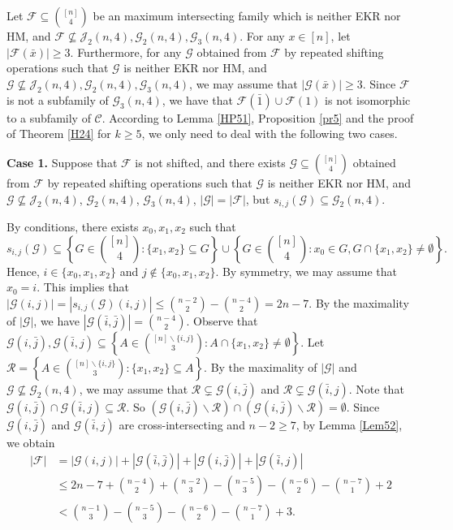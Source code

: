 \documentclass[11pt]{article}
\numberwithin{equation}{section}
\begin{document}
Let $\mathcal{F} \subseteq\binom{[n]}{4}$ be an maximum intersecting family which is neither EKR nor HM, and $\mathcal{F} \nsubseteq \mathcal{J}_2(n, 4),\mathcal{G}_2(n, 4), \mathcal{G}_3(n, 4)$. For any $x \in[n]$, let $|\mathcal{F}(\bar{x})|\geq 3$. Furthermore, 
for any $\mathcal{G}$ obtained from $\mathcal{F}$ by repeated shifting operations such that $\mathcal{G}$  is neither EKR nor HM, and  $\mathcal{G} \nsubseteq \mathcal{J}_2(n, 4), \mathcal{G}_2(n, 4), \mathcal{G}_3(n, 4)$, we may assume that $|\mathcal{G}(\bar{x})|\geq 3$.
Since $\mathcal{F}$ is not a subfamily of $\mathcal{G}_3(n, 4)$, we have that $\mathcal{F}(\bar{1})\cup \mathcal{F}(1)$ is  not isomorphic to a subfamily of $\mathcal{C}$.  According to Lemma \ref{HP51}, Proposition \ref{pr5} and the proof of Theorem \ref{H24} for $k\geq 5$, we only need to deal with the following two cases.

{\bf Case 1.}
 Suppose that $\mathcal{F}$ is not shifted, and there exists $\mathcal{G} \subseteq\binom{[n]}{4}$ obtained from $\mathcal{F}$ by repeated shifting operations such that $\mathcal{G}$  is neither EKR nor HM, and  $\mathcal{G} \nsubseteq \mathcal{J}_2(n, 4)$, $\mathcal{G}_2(n, 4)$, $\mathcal{G}_3(n, 4)$, $|\mathcal{G}|=|\mathcal{F}|$, but
$s_{i, j}(\mathcal{G})\subseteq \mathcal{G}_2(n, 4)$.

By conditions, there exists  $x_0, x_1, x_2$ such that
$$
s_{i, j}(\mathcal{G})\subseteq \left\{G \in\binom{[n]}{4}: \{x_1,x_2\} \subseteq G\right\} \cup\left\{G \in\binom{[n]}{4}: x_0 \in G, G \cap \{x_1,x_2\} \neq \emptyset\right\}.
$$
Hence, $i\in \{x_0, x_1, x_2\}$ and $j\notin \{x_0, x_1, x_2\}$. By symmetry, we may assume that $x_0=i$. This implies that $|\mathcal{G}(i,j)|=|s_{i, j}(\mathcal{G})(i,j)|\leq \binom{n-2}{2}- \binom{n-4}{2}= 2n-7$.
By the maximality of $|\mathcal{G}|$, we have $|\mathcal{G}(\bar{i},\bar{j})|=\binom{n-4}{2}$. Observe that $\mathcal{G}(i,\bar{j}), \mathcal{G}(\bar{i},j) \subseteq\left\{A \in\binom{[n]\backslash \{i,j\}}{3}:  A\cap \{x_1, x_2\}\neq \emptyset\right\}$. Let
$
\mathcal{R}=\left\{A \in\binom{[n]\backslash \{i,j\}}{3}: \{x_1,x_2\} \subseteq A\right\}.
$
By the maximality of $|\mathcal{G}|$ and $\mathcal{G} \nsubseteq\mathcal{G}_2(n, 4)$, we may assume that $\mathcal{R}\subsetneq \mathcal{G}(i,\bar{j})$ and $\mathcal{R}\subsetneq \mathcal{G}(\bar{i},j)$. Note that $\mathcal{G}(i,\bar{j})\cap \mathcal{G}(\bar{i},j)\subseteq \mathcal{R}$.
So $(\mathcal{G}(i,\bar{j})\backslash\mathcal{R}) \cap(\mathcal{G}(i,\bar{j})\backslash\mathcal{R}) =\emptyset$.
Since $\mathcal{G}(i,\bar{j})$ and $\mathcal{G}(\bar{i},j)$ are cross-intersecting and $n-2\geq 7$, by Lemma \ref{Lem52}, we obtain
\begin{align*}
|\mathcal{F}|&=|\mathcal{G}(i,j)|+|\mathcal{G}(\bar{i},\bar{j})|+|\mathcal{G}(i,\bar{j})|+|\mathcal{G}(\bar{i}, j)|\\
&\leq 2n-7+\binom{n-4}{2}+ \binom{n-2}{3}-\binom{n-5}{3}-\binom{n-6}{2}-\binom{n-7}{1}+2\\
&<\binom{n-1}{3}-\binom{n-5}{3}-\binom{n-6}{2}-\binom{n-7}{1}+3.
\end{align*}
\end{document}
